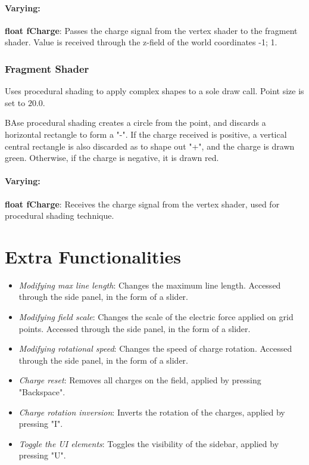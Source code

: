 \documentclass[10pt]{report}
\begin{document}
\subsubsection{Varying:}

\textbf{float fCharge}: Passes the charge signal from the vertex shader to the fragment shader. Value is received through the z-field of the world coordinates {-1; 1}.

\subsection{Fragment Shader}

Uses procedural shading to apply complex shapes to a sole draw call. Point size is set to $20.0$.

BAse procedural shading creates a circle from the point, and discards a horizontal rectangle to form a "-".
If the charge received is positive, a vertical central rectangle is also discarded as to shape out "+", and the charge is drawn green.
Otherwise, if the charge is negative, it is drawn red.

\subsubsection{Varying:}

\textbf{float fCharge}: Receives the charge signal from the vertex shader, used for procedural shading technique.

\chapter{Extra Functionalities}

\begin{itemize}
    \item \emph{Modifying max line length}: Changes the maximum line length. Accessed through the side panel, in the form of a slider.
    \item \emph{Modifying field scale}: Changes the scale of the electric force applied on grid points. Accessed through the side panel, in the form of a slider.
    \item \emph{Modifying rotational speed}: Changes the speed of charge rotation. Accessed through the side panel, in the form of a slider.
    \item \emph{Charge reset}: Removes all charges on the field, applied by pressing "Backspace".
    \item \emph{Charge rotation inversion}: Inverts the rotation of the charges, applied by pressing "I".
    \item \emph{Toggle the UI elements}: Toggles the visibility of the sidebar, applied by pressing "U".
\end{itemize}
\end{document}
